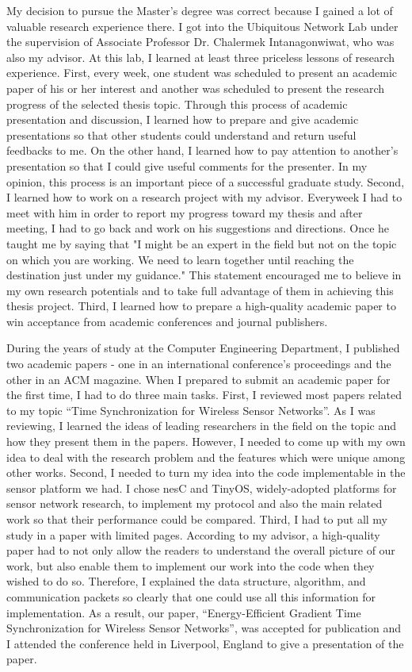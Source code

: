 \documentclass[a4paper,12pt]{report}
\begin{document}
\vspace{0.2cm}
My decision to pursue the Master's degree was correct because I gained a lot of valuable research experience there. I got into the Ubiquitous Network Lab under the supervision of Associate Professor Dr. Chalermek Intanagonwiwat, who was also my advisor. At this lab, I learned at least three priceless lessons of research experience. First, every week, one student was scheduled to present an academic paper of his or her interest and another was scheduled to present the research progress of the selected thesis topic. Through this process of academic presentation and discussion, I learned how to prepare and give academic presentations so that other students could understand and return useful feedbacks to me. On the other hand, I learned how to pay attention to another's presentation so that I could give useful comments for the presenter. In my opinion, this process is an important piece of a successful graduate study. Second, I learned how to work on a research project with my advisor. Everyweek I had to meet with him in order to report my progress toward my thesis and after meeting, I had to go back and work on his suggestions and directions. Once he taught me by saying that "I might be an expert in the field but not on the topic on which you are working. We need to learn together until reaching the destination just under my guidance." This statement encouraged me to believe in my own research potentials and to take full advantage of  them in achieving this thesis project. Third, I learned how to prepare a high-quality academic paper to win acceptance from academic conferences and journal publishers.

\vspace{0.2cm}
During the years of study at the Computer Engineering Department, I published two academic papers - one in an international conference's proceedings and the other in an ACM magazine. When I prepared to submit an academic paper for the first time, I had to do three main tasks. First, I reviewed most papers related to my topic ``Time Synchronization for Wireless Sensor Networks''. As I was reviewing, I learned the ideas of leading researchers in the field on the topic and how they present them in the papers. However, I needed to come up with my own idea to deal with the research problem and the features which were unique among other works. Second, I needed to turn my idea into the code implementable in the sensor platform we had. I chose nesC and TinyOS,  widely-adopted platforms for sensor network research, to implement my protocol and also the main related work so that their performance could be compared. Third, I had to put all my study in a paper with limited pages. According to my advisor, a high-quality paper had to not only allow the readers to understand the overall picture of our work, but also enable them to implement our work into the code when they wished to do so. Therefore, I explained the data structure, algorithm, and communication packets so clearly that one could use all this information for implementation. As a result, our paper, ``Energy-Efficient Gradient Time Synchronization for Wireless Sensor Networks'', was accepted for publication and I attended the conference held in Liverpool, England to give a presentation of the paper.
\end{document}
